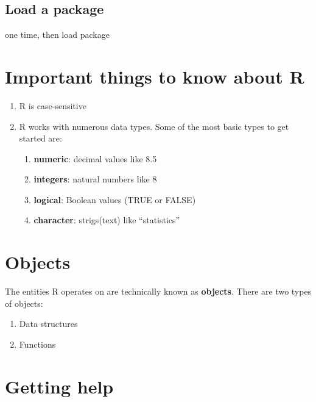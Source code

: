 \documentclass[]{book}
\begin{document}
\hypertarget{load-a-package}{%
\subsection{Load a package}\label{load-a-package}}

one time, then load package

\hypertarget{important-things-to-know-about-r}{%
\section{Important things to know about R}\label{important-things-to-know-about-r}}

\begin{enumerate}
\def\labelenumi{\arabic{enumi}.}
\item
  R is case-sensitive
\item
  R works with numerous data types. Some of the most basic types to get started are:

  \begin{enumerate}
  \def\labelenumii{\roman{enumii}.}
  \item
    \textbf{numeric}: decimal values like 8.5
  \item
    \textbf{integers}: natural numbers like 8
  \item
    \textbf{logical}: Boolean values (TRUE or FALSE)
  \item
    \textbf{character}: strigs(text) like ``statistics''
  \end{enumerate}
\end{enumerate}

\hypertarget{objects}{%
\section{Objects}\label{objects}}

The entities R operates on are technically known as \textbf{objects}. There are two types of objects:

\begin{enumerate}
\def\labelenumi{\arabic{enumi}.}
\item
  Data structures
\item
  Functions
\end{enumerate}

\hypertarget{getting-help}{%
\section{Getting help}\label{getting-help}}
\end{document}
